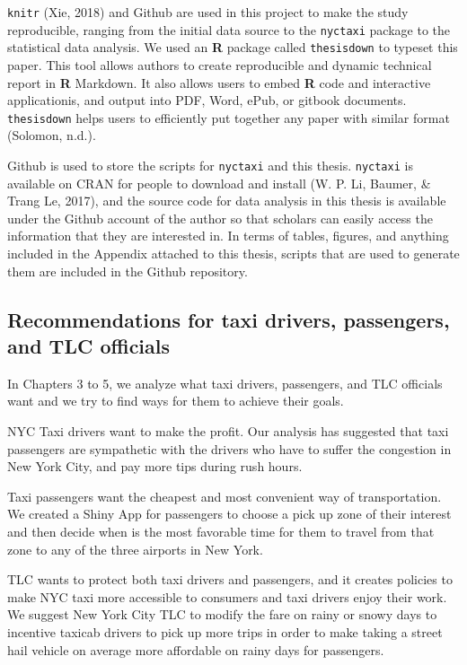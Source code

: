 \documentclass[12pt,twoside]{reedthesis}
\theoremstyle{definition}
\theoremstyle{definition}
\theoremstyle{definition}
\theoremstyle{remark}
\begin{document}
\texttt{knitr} (Xie, 2018) and Github are used in this project to make
the study reproducible, ranging from the initial data source to the
\texttt{nyctaxi} package to the statistical data analysis. We used an
\textbf{R} package called \texttt{thesisdown} to typeset this paper.
This tool allows authors to create reproducible and dynamic technical
report in \textbf{R} Markdown. It also allows users to embed \textbf{R}
code and interactive applicationis, and output into PDF, Word, ePub, or
gitbook documents. \texttt{thesisdown} helps users to efficiently put
together any paper with similar format (Solomon, n.d.).

Github is used to store the scripts for \texttt{nyctaxi} and this
thesis. \texttt{nyctaxi} is available on CRAN for people to download and
install (W. P. Li, Baumer, \& Trang Le, 2017), and the source code for
data analysis in this thesis is available under the Github account of
the author so that scholars can easily access the information that they
are interested in. In terms of tables, figures, and anything included in
the Appendix attached to this thesis, scripts that are used to generate
them are included in the Github repository.

\subsection{Recommendations for taxi drivers, passengers, and TLC
officials}\label{recommendations-for-taxi-drivers-passengers-and-tlc-officials}

In Chapters 3 to 5, we analyze what taxi drivers, passengers, and TLC
officials want and we try to find ways for them to achieve their goals.

NYC Taxi drivers want to make the profit. Our analysis has suggested
that taxi passengers are sympathetic with the drivers who have to suffer
the congestion in New York City, and pay more tips during rush hours.

Taxi passengers want the cheapest and most convenient way of
transportation. We created a Shiny App for passengers to choose a pick
up zone of their interest and then decide when is the most favorable
time for them to travel from that zone to any of the three airports in
New York.

TLC wants to protect both taxi drivers and passengers, and it creates
policies to make NYC taxi more accessible to consumers and taxi drivers
enjoy their work. We suggest New York City TLC to modify the fare on
rainy or snowy days to incentive taxicab drivers to pick up more trips
in order to make taking a street hail vehicle on average more affordable
on rainy days for passengers.
\end{document}

